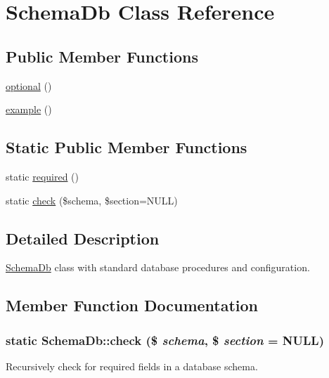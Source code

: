 \hypertarget{classSchemaDb}{
\section{SchemaDb Class Reference}
\label{classSchemaDb}
}
\subsection*{Public Member Functions}
\begin{DoxyCompactItemize}
\item 
\hyperlink{classSchemaDb_af5c9271759bed2f9cccc80a05f7c5da8}{optional} ()
\item 
\hyperlink{classSchemaDb_a923a94169459c4dee3f74000b4aa1807}{example} ()
\end{DoxyCompactItemize}
\subsection*{Static Public Member Functions}
\begin{DoxyCompactItemize}
\item 
static \hyperlink{classSchemaDb_a31db21bccb179162b5bb02b14b72d3e3}{required} ()
\item 
static \hyperlink{classSchemaDb_a42acc85b08a20b121204b1caf3a83e61}{check} (\$schema, \$section=NULL)
\end{DoxyCompactItemize}


\subsection{Detailed Description}
\hyperlink{classSchemaDb}{SchemaDb} class with standard database procedures and configuration. 

\subsection{Member Function Documentation}
\hypertarget{classSchemaDb_a42acc85b08a20b121204b1caf3a83e61}{
\subsubsection[{check}]{\setlength{\rightskip}{0pt plus 5cm}static SchemaDb::check (\$ {\em schema}, \/  \$ {\em section} = {\ttfamily NULL})}}
\label{classSchemaDb_a42acc85b08a20b121204b1caf3a83e61}
Recursively check for required fields in a database schema.

